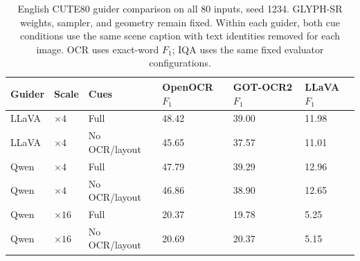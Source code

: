\begin{table}[H]
\centering
\caption{English CUTE80 guider comparison on all 80 inputs, seed 1234. GLYPH-SR weights, sampler, and geometry remain fixed. Within each guider, both cue conditions use the same scene caption with text identities removed for each image. OCR uses exact-word $F_1$; IQA uses the same fixed evaluator configurations.}
\label{tab:ar-common-english-ocr}
\small
\setlength{\tabcolsep}{4pt}
\begin{tabular}{llllll}
\toprule
Guider & Scale & Cues & OpenOCR $F_1$ & GOT-OCR2 $F_1$ & LLaVA $F_1$ \\
\midrule
LLaVA & $\times4$ & Full & 48.42 & 39.00 & 11.98 \\
LLaVA & $\times4$ & No OCR/layout & 45.65 & 37.57 & 11.01 \\
Qwen & $\times4$ & Full & 47.79 & 39.29 & 12.96 \\
Qwen & $\times4$ & No OCR/layout & 46.86 & 38.90 & 12.65 \\
Qwen & $\times16$ & Full & 20.37 & 19.78 & 5.25 \\
Qwen & $\times16$ & No OCR/layout & 20.69 & 20.37 & 5.15 \\
\bottomrule
\end{tabular}
\end{table}
